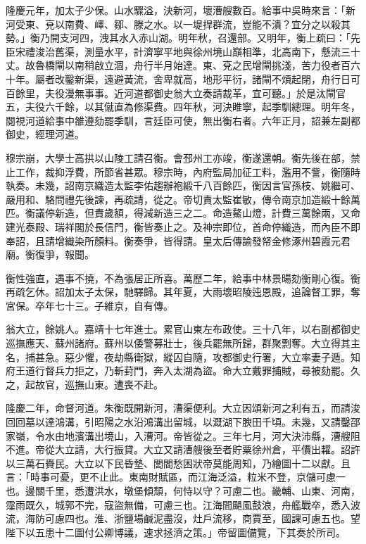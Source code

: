 \begin{pinyinscope}
{{隆慶元年，加太子少保。山水驟溢，決新河，壞漕艘數百。給事中吳時來言：「新河受東、兗以南費、嶧、鄒、滕之水。以一堤捍群流，豈能不潰？宜分之以殺其勢。」衡乃開支河四，洩其水入赤山湖。明年秋，召還部。又明年，衡上疏曰：「先臣宋禮浚治舊渠，測量水平，計濟寧平地與徐州境山巔相準，北高南下，懸流三十丈。故魯橋閘以南稍啟立涸，舟行半月始達。東、兗之民增閘挑淺，苦力役者百六十年。屬者改鑿新渠，遠避黃流，舍卑就高，地形平衍，諸閘不煩起閉，舟行日可百餘里，夫役漫無事事。近河道都御史翁大立奏請裁革，宜可聽。」於是汰閘官五，夫役六千餘，以其僦直為修渠費。四年秋，河決睢寧，起季馴總理。明年冬，閱視河道給事中雒遵劾罷季馴，言廷臣可使，無出衡右者。六年正月，詔兼左副都御史，經理河道。

穆宗崩，大學士高拱以山陵工請召衡。會邳州工亦竣，衡遂還朝。衡先後在部，禁止工作，裁抑浮費，所節省甚眾。穆宗時，內府監局加征工料，濫用不訾，衡隨時執奏。未幾，詔南京織造太監李佑趨辦袍緞千八百餘匹，衡因言官孫枝、姚繼可、嚴用和、駱問禮先後諫，再疏請，從之。帝切責太監崔敏，傳令南京加造緞十餘萬匹。衡議停新造，但責歲額，得減新造三之二。命造鰲山燈，計費三萬餘兩，又命建光泰殿、瑞祥閣於長信門，衡皆奏止之。及神宗即位，首命停織造，而內臣不即奉詔，且請增織染所顏料。衡奏爭，皆得請。皇太后傳諭發帑金修涿州碧霞元君廟。衡復爭，報聞。

衡性強直，遇事不撓，不為張居正所喜。萬歷二年，給事中林景暘劾衡剛心復。衡再疏乞休。詔加太子太保，馳驛歸。其年夏，大雨壞昭陵迍恩殿，追論督工罪，奪宮保。卒年七十三。子維京，自有傳。

翁大立，餘姚人。嘉靖十七年進士。累官山東左布政使。三十八年，以右副都御史巡撫應天、蘇州諸府。蘇州以倭警募壯士，後兵罷無所歸，群聚剽奪。大立得其主名，捕甚急。惡少懼，夜劫縣衛獄，縱囚自隨，攻都御史行署，大立率妻子遁。知府王道行督兵力拒之，乃斬葑門，奔入太湖為盜。命大立戴罪捕賊，尋被劾罷。久之，起故官，巡撫山東。遭喪不赴。

隆慶二年，命督河道。朱衡既開新河，漕渠便利。大立因頌新河之利有五，而請浚回回墓以達鴻溝，引昭陽之水沿鴻溝出留城，以溉湖下腴田千頃。未幾，又請鑿邵家嶺，令水由地濱溝出境山，入漕河。帝皆從之。三年七月，河大決沛縣，漕艘阻不進。帝從大立請，大行振貸。大立又請漕艘後至者貯粟徐州倉，平價出糶。詔許以三萬石賚民。大立以下民昏墊、閭閻愁困狀帝莫能周知，乃繪圖十二以獻。且言：「時事可憂，更不止此。東南財賦區，而江海泛溢，粒米不登，京儲可慮一也。邊關千里，悉遭洪水，墩堡傾頹，何恃以守？可慮二也。畿輔、山東、河南，霪雨既久，城郭不完，寇盜無備，可慮三也。江海間颶風鼓浪，舟艦戰卒，悉入波流，海防可慮四也。淮、浙鹽場鹹泥盡沒，灶戶流移，商賈至，國課可慮五也。望陛下以五患十二圖付公卿博議，速求拯濟之策。」帝留圖備覽，下其奏於所司。

}}
\end{pinyinscope}
